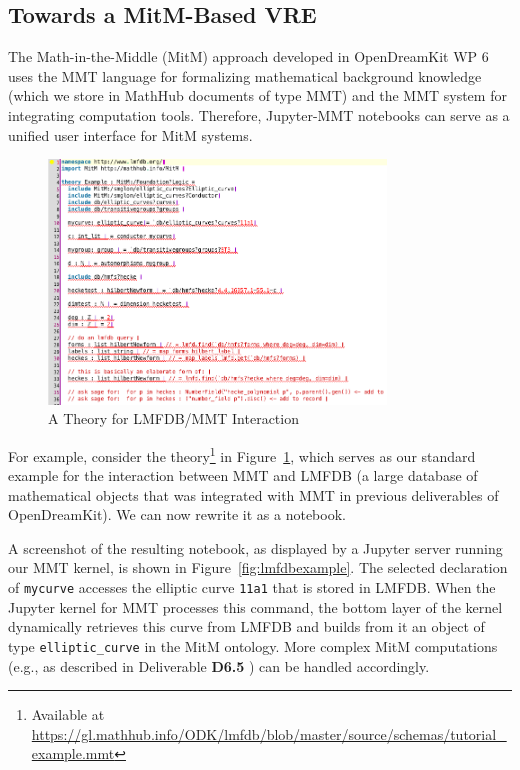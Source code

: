 \subsection{Towards a MitM-Based VRE}

The Math-in-the-Middle (MitM) approach developed in OpenDreamKit WP 6 uses the MMT language for formalizing mathematical background knowledge (which we store in MathHub documents of type MMT) and the MMT system for integrating computation tools.
Therefore, Jupyter-MMT notebooks can serve as a unified user interface for MitM systems.

\begin{figure}[ht]\centering
  \includegraphics[width=0.8\textwidth]{hecke}
  \caption{A Theory for LMFDB/MMT Interaction}\label{fig:hecke}
\end{figure}

For example, consider the theory\footnote{Available at \url{https://gl.mathhub.info/ODK/lmfdb/blob/master/source/schemas/tutorial_example.mmt}}  in Figure~\ref{fig:hecke}, which serves as our standard example for the interaction between MMT and LMFDB (a large database of mathematical objects that was integrated with MMT in previous deliverables of OpenDreamKit).
We can now rewrite it as a notebook.


A screenshot of the resulting notebook, as displayed by a Jupyter server running our MMT kernel, is shown in Figure~\ref{fig:lmfdbexample}.
The selected declaration of \texttt{mycurve} accesses the elliptic curve \texttt{11a1} that is stored in LMFDB.
When the Jupyter kernel for MMT processes this command, the bottom layer of the kernel dynamically retrieves this curve from LMFDB and builds from it an object of type \texttt{elliptic\_curve} in the MitM ontology.
More complex MitM computations (e.g., as described in Deliverable \textbf{D6.5} \cite{ODK-D6.5}) can be handled accordingly.

